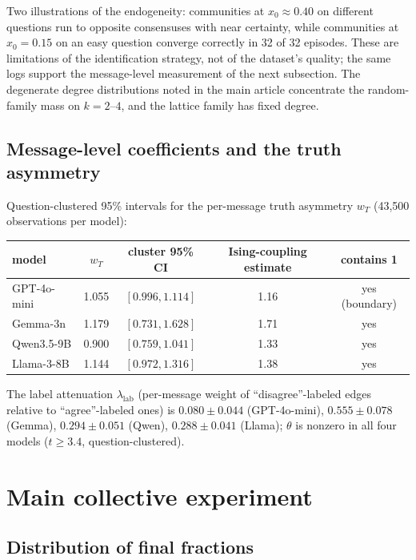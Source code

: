 \documentclass[11pt]{article}
\begin{document}
Two illustrations of the endogeneity: communities at $x_0 \approx 0.40$ on
different questions run to opposite consensuses with near certainty, while
communities at $x_0 = 0.15$ on an easy question converge correctly in 32 of
32 episodes. These are limitations of the identification strategy, not of
the dataset's quality; the same logs support the message-level measurement
of the next subsection. The degenerate degree distributions noted in the
main article concentrate the random-family mass on $k = 2$--$4$, and the
lattice family has fixed degree.

\subsection{Message-level coefficients and the truth asymmetry}

Question-clustered 95\% intervals for the per-message truth asymmetry $w_T$
(43{,}500 observations per model):

\begin{center}
\begin{tabular}{lcccc}
\toprule
model & $w_T$ & cluster 95\% CI & Ising-coupling estimate & contains 1 \\
\midrule
GPT-4o-mini & 1.055 & $[0.996, 1.114]$ & 1.16 & yes (boundary) \\
Gemma-3n    & 1.179 & $[0.731, 1.628]$ & 1.71 & yes \\
Qwen3.5-9B  & 0.900 & $[0.759, 1.041]$ & 1.33 & yes \\
Llama-3-8B  & 1.144 & $[0.972, 1.316]$ & 1.38 & yes \\
\bottomrule
\end{tabular}
\end{center}

The label attenuation $\lambda_{\mathrm{lab}}$ (per-message weight of
``disagree''-labeled edges relative to ``agree''-labeled ones) is
$0.080 \pm 0.044$ (GPT-4o-mini), $0.555 \pm 0.078$ (Gemma), $0.294 \pm 0.051$
(Qwen), $0.288 \pm 0.041$ (Llama); $\theta$ is nonzero in all four models
($t \ge 3.4$, question-clustered).

\section{Main collective experiment}

\subsection{Distribution of final fractions}
\end{document}
